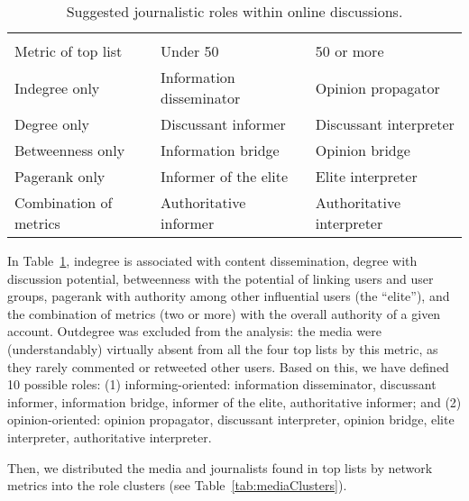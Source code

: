 \begin{table}[ht]%
	\centering
	\caption{Suggested journalistic roles within online discussions.}%
	\label{tab:suggestedJournalisticRoles}%
	\begin{adjustbox}{width=1\textwidth}
		\small
		\begin{tabular}{ l  l  l }%
			\toprule
			& \multicolumn{2}{c}{\makecell{Percentage of opinion in content}}\\
			\cline{2-3}
			Metric of top list & Under 50 & 50 or more \\
			\hline
			Indegree only & Information disseminator & Opinion propagator \\
			Degree only & Discussant informer & Discussant interpreter \\
			Betweenness only & Information bridge & Opinion bridge \\
			Pagerank only & Informer of the elite & Elite interpreter \\
			Combination of metrics & Authoritative informer & Authoritative interpreter \\
			\hline
		\end{tabular}%
	\end{adjustbox}
\end{table}

In Table~\cref{tab:suggestedJournalisticRoles}, indegree is associated with content dissemination, degree with discussion potential, betweenness with the potential of linking users and user groups, pagerank with authority among other influential users (the “elite”), and the combination of metrics (two or more) with the overall authority of a given account. Outdegree was excluded from the analysis: the media were (understandably) virtually absent from all the four top lists by this metric, as they rarely commented or retweeted other users. Based on this, we have defined 10 possible roles: (1) informing-oriented: information disseminator, discussant informer, information bridge, informer of the elite, authoritative informer; and (2) opinion-oriented: opinion propagator, discussant interpreter, opinion bridge, elite interpreter, authoritative interpreter.

Then, we distributed the media and journalists found in top lists by network metrics into the role clusters (see Table~\cref{tab:mediaClusters}).

